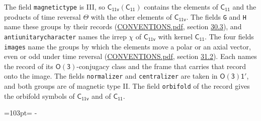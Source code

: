\documentclass[10pt,a4paper]{article}
\newcommand{\needspace}[1]{\par\penalty-100\begingroup\dimen0=#1\relax\dimen2=\pagegoal
  \advance\dimen2-\pagetotal\ifdim\dimen0>\dimen2\relax\ifdim\dimen2>0pt\vfil\break\fi\fi
  \endgroup}
\numberwithin{equation}{section}
\newcommand{\grp}[1]{\mathsf{#1}}
\begin{document}
The field \texttt{magnetictype} is III, so $\grp{C_{11v}}(\grp{C_{11}})$ contains the elements of $\grp{C_{11}}$ and the products of time reversal $\varTheta$ with the other elements of $\grp{C_{11v}}$. The fields \texttt{G} and \texttt{H} name these groups by their records (\href{../../CONVENTIONS.pdf}{CONVENTIONS.pdf}, section \href{../../CONVENTIONS.pdf\#conv.30.3}{30.3}), and \texttt{antiunitarycharacter} names the irrep $\chi$ of $\grp{C_{11v}}$ with kernel $\grp{C_{11}}$. The four fields \texttt{images} name the groups by which the elements move a polar or an axial vector, even or odd under time reversal (\href{../../CONVENTIONS.pdf}{CONVENTIONS.pdf}, section \href{../../CONVENTIONS.pdf\#conv.31.2}{31.2}). Each names the record of its $\grp{O(3)}$-conjugacy class and the frame that carries that record onto the image. The fields \texttt{normalizer} and \texttt{centralizer} are taken in $\grp{O(3)1'}$, and both groups are of magnetic type II. The field \texttt{orbifold} of the record gives the orbifold symbols of $\grp{C_{11v}}$ and of $\grp{C_{11}}$.
\needspace{103pt}
\end{document}

